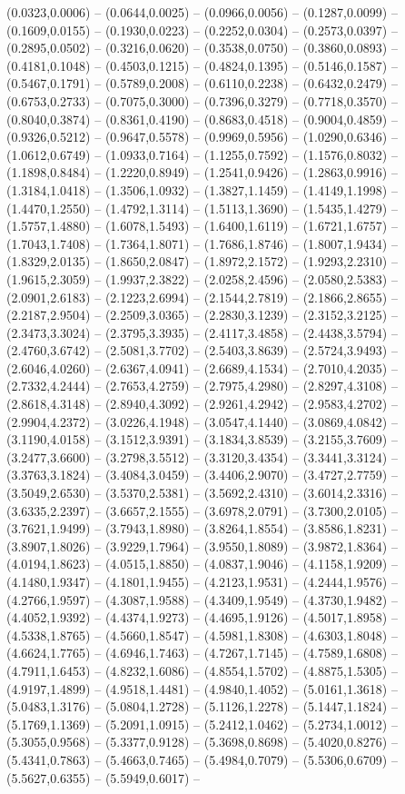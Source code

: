  (0.0323,0.0006) -- (0.0644,0.0025) -- (0.0966,0.0056) -- (0.1287,0.0099) -- (0.1609,0.0155) -- (0.1930,0.0223) -- (0.2252,0.0304) -- (0.2573,0.0397) -- (0.2895,0.0502) -- (0.3216,0.0620) -- (0.3538,0.0750) -- (0.3860,0.0893) -- (0.4181,0.1048) -- (0.4503,0.1215) -- (0.4824,0.1395) -- (0.5146,0.1587) -- (0.5467,0.1791) -- (0.5789,0.2008) -- (0.6110,0.2238) -- (0.6432,0.2479) -- (0.6753,0.2733) -- (0.7075,0.3000) -- (0.7396,0.3279) -- (0.7718,0.3570) -- (0.8040,0.3874) -- (0.8361,0.4190) -- (0.8683,0.4518) -- (0.9004,0.4859) -- (0.9326,0.5212) -- (0.9647,0.5578) -- (0.9969,0.5956) -- (1.0290,0.6346) -- (1.0612,0.6749) -- (1.0933,0.7164) -- (1.1255,0.7592) -- (1.1576,0.8032) -- (1.1898,0.8484) -- (1.2220,0.8949) -- (1.2541,0.9426) -- (1.2863,0.9916) -- (1.3184,1.0418) -- (1.3506,1.0932) -- (1.3827,1.1459) -- (1.4149,1.1998) -- (1.4470,1.2550) -- (1.4792,1.3114) -- (1.5113,1.3690) -- (1.5435,1.4279) -- (1.5757,1.4880) -- (1.6078,1.5493) -- (1.6400,1.6119) -- (1.6721,1.6757) -- (1.7043,1.7408) -- (1.7364,1.8071) -- (1.7686,1.8746) -- (1.8007,1.9434) -- (1.8329,2.0135) -- (1.8650,2.0847) -- (1.8972,2.1572) -- (1.9293,2.2310) -- (1.9615,2.3059) -- (1.9937,2.3822) -- (2.0258,2.4596) -- (2.0580,2.5383) -- (2.0901,2.6183) -- (2.1223,2.6994) -- (2.1544,2.7819) -- (2.1866,2.8655) -- (2.2187,2.9504) -- (2.2509,3.0365) -- (2.2830,3.1239) -- (2.3152,3.2125) -- (2.3473,3.3024) -- (2.3795,3.3935) -- (2.4117,3.4858) -- (2.4438,3.5794) -- (2.4760,3.6742) -- (2.5081,3.7702) -- (2.5403,3.8639) -- (2.5724,3.9493) -- (2.6046,4.0260) -- (2.6367,4.0941) -- (2.6689,4.1534) -- (2.7010,4.2035) -- (2.7332,4.2444) -- (2.7653,4.2759) -- (2.7975,4.2980) -- (2.8297,4.3108) -- (2.8618,4.3148) -- (2.8940,4.3092) -- (2.9261,4.2942) -- (2.9583,4.2702) -- (2.9904,4.2372) -- (3.0226,4.1948) -- (3.0547,4.1440) -- (3.0869,4.0842) -- (3.1190,4.0158) -- (3.1512,3.9391) -- (3.1834,3.8539) -- (3.2155,3.7609) -- (3.2477,3.6600) -- (3.2798,3.5512) -- (3.3120,3.4354) -- (3.3441,3.3124) -- (3.3763,3.1824) -- (3.4084,3.0459) -- (3.4406,2.9070) -- (3.4727,2.7759) -- (3.5049,2.6530) -- (3.5370,2.5381) -- (3.5692,2.4310) -- (3.6014,2.3316) -- (3.6335,2.2397) -- (3.6657,2.1555) -- (3.6978,2.0791) -- (3.7300,2.0105) -- (3.7621,1.9499) -- (3.7943,1.8980) -- (3.8264,1.8554) -- (3.8586,1.8231) -- (3.8907,1.8026) -- (3.9229,1.7964) -- (3.9550,1.8089) -- (3.9872,1.8364) -- (4.0194,1.8623) -- (4.0515,1.8850) -- (4.0837,1.9046) -- (4.1158,1.9209) -- (4.1480,1.9347) -- (4.1801,1.9455) -- (4.2123,1.9531) -- (4.2444,1.9576) -- (4.2766,1.9597) -- (4.3087,1.9588) -- (4.3409,1.9549) -- (4.3730,1.9482) -- (4.4052,1.9392) -- (4.4374,1.9273) -- (4.4695,1.9126) -- (4.5017,1.8958) -- (4.5338,1.8765) -- (4.5660,1.8547) -- (4.5981,1.8308) -- (4.6303,1.8048) -- (4.6624,1.7765) -- (4.6946,1.7463) -- (4.7267,1.7145) -- (4.7589,1.6808) -- (4.7911,1.6453) -- (4.8232,1.6086) -- (4.8554,1.5702) -- (4.8875,1.5305) -- (4.9197,1.4899) -- (4.9518,1.4481) -- (4.9840,1.4052) -- (5.0161,1.3618) -- (5.0483,1.3176) -- (5.0804,1.2728) -- (5.1126,1.2278) -- (5.1447,1.1824) -- (5.1769,1.1369) -- (5.2091,1.0915) -- (5.2412,1.0462) -- (5.2734,1.0012) -- (5.3055,0.9568) -- (5.3377,0.9128) -- (5.3698,0.8698) -- (5.4020,0.8276) -- (5.4341,0.7863) -- (5.4663,0.7465) -- (5.4984,0.7079) -- (5.5306,0.6709) -- (5.5627,0.6355) -- (5.5949,0.6017) -- 